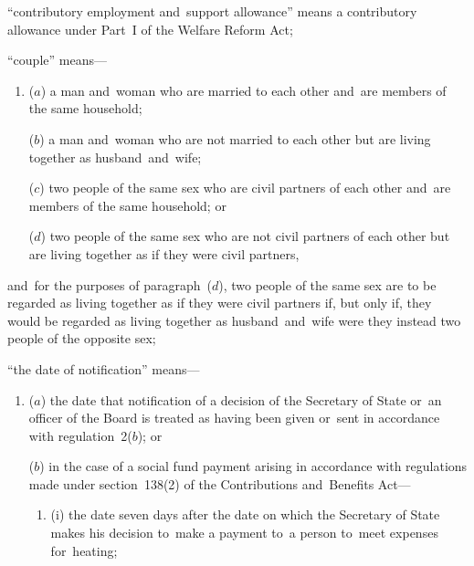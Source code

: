 \documentclass[12pt,a4paper]{article}
\begin{document}
\begin{enumerate}


“contributory employment and~support allowance” means a contributory allowance under Part~I of the Welfare Reform Act;

“couple” means—
\begin{enumerate}\item[]
($a$) 
a man and~woman who are married to each other and~are members of the same household;

($b$) 
a man and~woman who are not married to each other but are living together as husband~and~wife;

($c$) 
two people of the same sex who are civil partners of each other and~are members of the same household; or

($d$) 
two people of the same sex who are not civil partners of each other but are living together as if they were civil partners,
\end{enumerate}
and~for the purposes of paragraph~($d$), two people of the same sex are to be regarded as living together as if they were civil partners if, but only if, they would be regarded as living together as husband~and~wife were they instead two people of the opposite sex; 

“the date of notification” means—
\begin{enumerate}\item[]
($a$) the date that notification of a decision of the Secretary of State 
or~an officer of the Board  %
is treated as having been given or~sent in accordance with regulation~2($b$); or

($b$) in the case of a social fund payment arising in accordance with regulations made under section~138(2) of the Contributions and~Benefits Act—
\begin{enumerate}\item[]
(i) the date seven days after the date on which the Secretary of State makes his decision to~make a payment to~a person to~meet expenses for~heating;


\end{enumerate}
\end{enumerate}
\end{enumerate}
\end{document}
